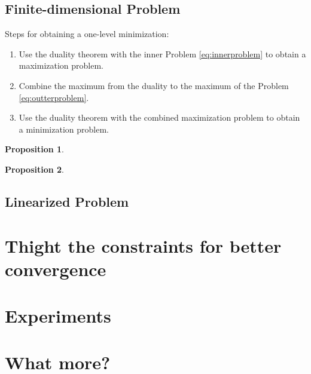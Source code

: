 \documentclass{beamer}
\newtheorem{proposition}{Proposition}
\begin{document}
	\subsection{Finite-dimensional Problem}
	\begin{frame}[allowframebreaks]
		Steps for obtaining a one-level minimization:
		\begin{enumerate}
			\item Use the duality theorem with the inner Problem \ref{eq:innerproblem} to obtain a maximization problem.
			\item Combine the maximum from the duality to the maximum of the Problem \ref{eq:outterproblem}.
			\item Use the duality theorem with the combined maximization problem to obtain a minimization problem.
		\end{enumerate}
		
		\framebreak
		\begin{proposition}
		\end{proposition}
		
		\framebreak
		\begin{proposition}
		\end{proposition}
	\end{frame}
	
	\subsection{Linearized Problem}
	\begin{frame}
	\end{frame}
	
	\section{Thight the constraints for better convergence} %
	\begin{frame}
	\end{frame}
	
	\section{Experiments} %
	\begin{frame}
	\end{frame}
	
	\section{What more?} %
	\begin{frame}
	\end{frame}
\end{document}
